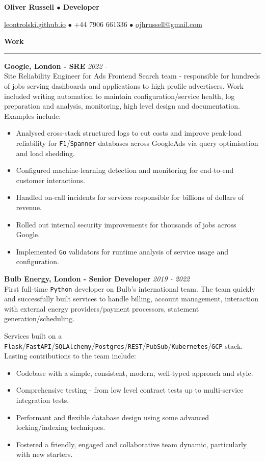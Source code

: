 \documentclass[11pt,a4paper]{article}
\newenvironment{rSection}[1]{
  \smallskip
  {\bf #1}
  \medskip
  \hrule
  \medskip
  \begin{list}{}{
    \setlength{\leftmargin}{1.2em}
  }
  \item[]
}{
  \end{list}
}
\begin{document}
\centerline{\bf Oliver Russell $\bullet$ Developer}
\centerline{\href{https://leontrolski.github.io}{leontrolski.github.io} $\bullet$ +44 7906 661336 $\bullet$ \href{mailto:ojhrussell@gmail.com}{ojhrussell@gmail.com}}
\par
\smallskip

\begin{rSection}{Work}

{\bf Google, London - SRE} \hfill{\em 2022 -} 
\\Site Reliability Engineer for Ads Frontend Search team - responsible for hundreds of jobs serving dashboards and applications to high profile advertisers. Work included writing automation to maintain configuration/service health, log preparation and analysis, monitoring, high level design and documentation. Examples include:
\setlength{\parskip}{0.2em}
\begin{itemize}
\item Analysed cross-stack structured logs to cut costs and improve peak-load reliability for \texttt{F1}/\texttt{Spanner} databases across GoogleAds via query optimisation and load shedding.
\item Configured machine-learning detection and monitoring for end-to-end customer interactions.
\item Handled on-call incidents for services responsible for billions of dollars of revenue.
\item Rolled out internal security improvements for thousands of jobs across Google.
\item Implemented \texttt{Go} validators for runtime analysis of service usage and configuration.
\end{itemize}
\setlength{\parskip}{0.5em}

\smallskip
{\bf Bulb Energy, London - Senior Developer} \hfill{\em 2019 - 2022} 
\\ First full-time \texttt{Python} developer on Bulb's international team. The team quickly and successfully built services to handle billing, account management, interaction with external energy providers/payment processors, statement generation/scheduling.

\par Services built on a \texttt{Flask}/\texttt{FastAPI}/\texttt{SQLAlchemy}/\texttt{Postgres}/\texttt{REST}/\texttt{PubSub}/\texttt{Kubernetes}/\texttt{GCP} stack. Lasting contributions to the team include:
\setlength{\parskip}{0.2em}
\begin{itemize}
\item Codebase with a simple, consistent, modern, well-typed approach and style.
\item Comprehensive testing - from low level contract tests up to multi-service integration tests.
\item Performant and flexible database design using some advanced locking/indexing techniques.
\item Fostered a friendly, engaged and collaborative team dynamic, particularly with new starters.
\end{itemize}
\setlength{\parskip}{0.5em}


\end{rSection}
\end{document}
